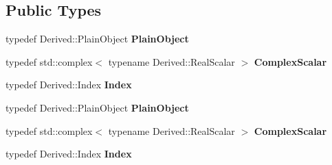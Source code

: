 \subsection*{Public Types}
\begin{DoxyCompactItemize}
\item 
\mbox{\label{class_eigen_1_1_matrix_complex_power_return_value_a3fb38012e6585bdab174b4568de1c0c3}} 
typedef Derived\+::\+Plain\+Object {\bfseries Plain\+Object}
\item 
\mbox{\label{class_eigen_1_1_matrix_complex_power_return_value_a98614ea5816e40e40487e0a8cfe5570c}} 
typedef std\+::complex$<$ typename Derived\+::\+Real\+Scalar $>$ {\bfseries Complex\+Scalar}
\item 
\mbox{\label{class_eigen_1_1_matrix_complex_power_return_value_a4e85e4204cd4d8976176561959597c17}} 
typedef Derived\+::\+Index {\bfseries Index}
\item 
\mbox{\label{class_eigen_1_1_matrix_complex_power_return_value_a3fb38012e6585bdab174b4568de1c0c3}} 
typedef Derived\+::\+Plain\+Object {\bfseries Plain\+Object}
\item 
\mbox{\label{class_eigen_1_1_matrix_complex_power_return_value_a98614ea5816e40e40487e0a8cfe5570c}} 
typedef std\+::complex$<$ typename Derived\+::\+Real\+Scalar $>$ {\bfseries Complex\+Scalar}
\item 
\mbox{\label{class_eigen_1_1_matrix_complex_power_return_value_a4e85e4204cd4d8976176561959597c17}} 
typedef Derived\+::\+Index {\bfseries Index}
\end{DoxyCompactItemize}
